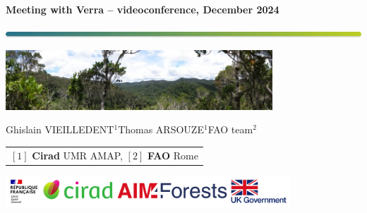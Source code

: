 
{
  \begin{frame}
  \begin{center}
  \small{\textbf{Meeting with Verra -- videoconference, December 2024}}
  \end{center}
  \vspace{-0.5cm}
  \titlepage %
  \vspace{-3cm}
  \begin{center}
    \includegraphics[width=\textwidth]{figs/Barre_couleur}
    
    \vspace{0.25cm}
    
    \includegraphics[width=10cm]{figs/Banniere}
    
    \small{Ghislain VIEILLEDENT$^{1}$\hspace{0.25cm}Thomas ARSOUZE$^{1}$\hspace{0.25cm}FAO team$^{2}$}
      
    \vspace{0.25cm}
    
    {\scriptsize
      \begin{tabular}{l}
        $[1]$ \textbf{Cirad} UMR AMAP, $[2]$ \textbf{FAO} Rome
      \end{tabular}
    }
    
    \includegraphics[width=0.8\textwidth]{figs/partners_logos}
    
  \end{center}
  \end{frame}
}

